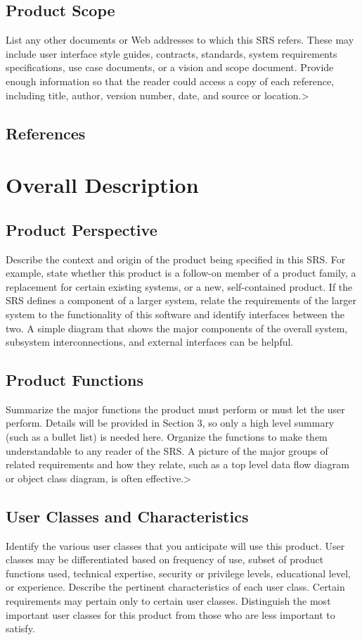 \documentclass{scrreprt}
\begin{document}
    \section{Product Scope}
    List any other documents or Web addresses to which this SRS refers. These may include user interface style guides, contracts, standards, system requirements specifications, use case documents, or a vision and scope document. Provide enough information so that the reader could access a copy of each reference, including title, author, version number, date, and source or location.>
    \section{References} 
    
    \chapter{Overall Description} 
    \section{Product Perspective}
    Describe the context and origin of the product being specified in this SRS. For example, state whether this product is a follow-on member of a product family, a replacement for certain existing systems, or a new, self-contained product. If the SRS defines a component of a larger system, relate the requirements of the larger system to the functionality of this software and identify interfaces between the two. A simple diagram that shows the major components of the overall system, subsystem interconnections, and external interfaces can be helpful.
    \section{Product Functions}
    Summarize the major functions the product must perform or must let the user perform. Details will be provided in Section 3, so only a high level summary (such as a bullet list) is needed here. Organize the functions to make them understandable to any reader of the SRS. A picture of the major groups of related requirements and how they relate, such as a top level data flow diagram or object class diagram, is often effective.>
    \section{User Classes and Characteristics}
    Identify the various user classes that you anticipate will use this product. User classes may be differentiated based on frequency of use, subset of product functions used, technical expertise, security or privilege levels, educational level, or experience. Describe the pertinent characteristics of each user class. Certain requirements may pertain only to certain user classes. Distinguish the most important user classes for this product from those who are less important to satisfy.
\end{document}
